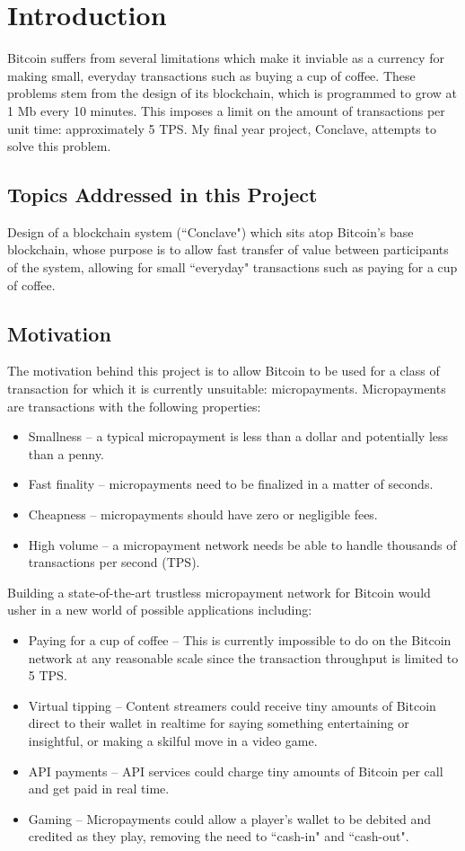 \documentclass{report}
\begin{document}
\listoffigures
\listoftables
\tableofcontents

\chapter{Introduction}
	Bitcoin \cite{bitcoin} suffers from several limitations which make it inviable as a currency for making small, everyday transactions such as buying a cup of coffee. These problems stem from the design of its blockchain, which is programmed to grow at 1 Mb every 10 minutes. This imposes a limit on the amount of transactions per unit time: approximately 5 TPS. My final year project, Conclave, attempts to solve this problem. 
	\section{Topics Addressed in this Project}
		Design of a blockchain system (``Conclave") which sits atop Bitcoin’s base blockchain, whose purpose is to allow fast transfer of value between participants of the system, allowing for small ``everyday" transactions such as paying for a cup of coffee.
	\section{Motivation}
		The motivation behind this project is to allow Bitcoin to be used for a class of transaction for which it is currently unsuitable: micropayments. Micropayments  are transactions with the following properties: 
		\begin{itemize}
			\item Smallness – a typical micropayment is less than a dollar and potentially less than a penny.
			\item Fast finality – micropayments need to be finalized in a matter of seconds.
			\item Cheapness – micropayments should have zero or negligible fees.
			\item High volume – a micropayment network needs be able to handle thousands of transactions per second (TPS).
		\end{itemize}
	 	Building a state-of-the-art trustless micropayment network for Bitcoin would usher in a new world of possible applications including: 
		\begin{itemize}
			\item Paying for a cup of coffee – This is currently impossible to do on the Bitcoin network at any reasonable scale since the transaction throughput is limited to 5 TPS.
			\item Virtual tipping  – Content streamers could receive tiny amounts of Bitcoin direct to their wallet in realtime for saying something entertaining or insightful, or making a skilful move in a video game.
			\item API payments  – API services could charge tiny amounts of Bitcoin per call and get paid in real time.
			\item Gaming  – Micropayments could allow a player’s wallet to be debited and credited as they play, removing the need to ``cash-in" and ``cash-out".
		\end{itemize}
\end{document}
